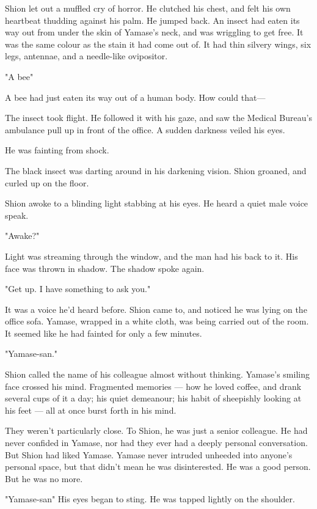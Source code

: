 Shion let out a muffled cry of horror. He clutched his chest, and felt
his own heartbeat thudding against his palm. He jumped back. An insect
had eaten its way out from under the skin of Yamase's neck, and was
wriggling to get free. It was the same colour as the stain it had come
out of. It had thin silvery wings, six legs, antennae, and a needle-like
ovipositor.

"A bee\el "

A bee had just eaten its way out of a human body. How could that---

The insect took flight. He followed it with his gaze, and saw the
Medical Bureau's ambulance pull up in front of the office. A sudden
darkness veiled his eyes.

He was fainting from shock.

The black insect was darting around in his darkening vision. Shion
groaned, and curled up on the floor.

\myspace

Shion awoke to a blinding light stabbing at his eyes. He heard a quiet
male voice speak.

"Awake?"

Light was streaming through the window, and the man had his back to it.
His face was thrown in shadow. The shadow spoke again.

"Get up. I have something to ask you."

It was a voice he'd heard before. Shion came to, and noticed he was
lying on the office sofa. Yamase, wrapped in a white cloth, was being
carried out of the room. It seemed like he had fainted for only a few
minutes.

"Yamase-san."

Shion called the name of his colleague almost without thinking. Yamase's
smiling face crossed his mind. Fragmented memories --- how he loved
coffee, and drank several cups of it a day; his quiet demeanour; his
habit of sheepishly looking at his feet --- all at once burst forth in his
mind.

They weren't particularly close. To Shion, he was just a senior
colleague. He had never confided in Yamase, nor had they ever had a
deeply personal conversation. But Shion had liked Yamase. Yamase never
intruded unheeded into anyone's personal space, but that didn't mean he
was disinterested. He was a good person. But he was no more.

"Yamase-san\el " His eyes began to sting. He was tapped lightly on the
shoulder.

